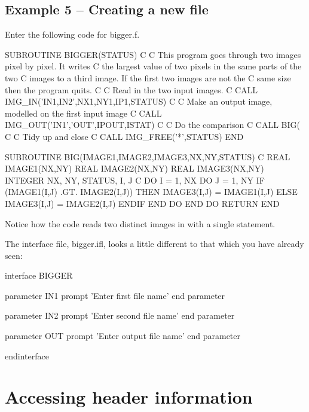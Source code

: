 \documentclass[11pt,nolof]{starlink}
\begin{document}
\subsection{Example 5 -- Creating a new file}

Enter the following code for \textsf{bigger.f}.

\begin{small}
\begin{terminalv}
      SUBROUTINE BIGGER(STATUS)
C
C This program goes through two images pixel by pixel. It writes
C the largest value of two pixels in the same parts of the two
C images to a third image. If the first two images are not the
C same size then the program quits.
C
C Read in the two input images.
C
      CALL IMG_IN('IN1,IN2',NX1,NY1,IP1,STATUS)
C
C Make an output image, modelled on the first input image
C
      CALL IMG_OUT('IN1','OUT',IPOUT,ISTAT)
C
C Do the comparison
C
      CALL BIG(%
C
C Tidy up and close
C
      CALL IMG_FREE('*',STATUS)
      END

      SUBROUTINE BIG(IMAGE1,IMAGE2,IMAGE3,NX,NY,STATUS)
C
      REAL IMAGE1(NX,NY)
      REAL IMAGE2(NX,NY)
      REAL IMAGE3(NX,NY)
      INTEGER NX, NY, STATUS, I, J
C
      DO I = 1, NX
        DO J = 1, NY
          IF (IMAGE1(I,J) .GT. IMAGE2(I,J)) THEN
            IMAGE3(I,J) = IMAGE1(I,J)
          ELSE
            IMAGE3(I,J) = IMAGE2(I,J)
          ENDIF
        END DO
      END DO
      RETURN
      END
\end{terminalv}
\end{small}

Notice how the code reads two distinct images in with a single statement.

The interface file, \textsf{bigger.ifl}, looks a little different to that
which you have already seen:

\begin{small}
\begin{terminalv}
interface BIGGER

  parameter IN1
    prompt 'Enter first file name'
  end parameter

  parameter IN2
    prompt 'Enter second file name'
  end parameter

  parameter OUT
    prompt 'Enter output file name'
  end parameter

endinterface
\end{terminalv}
\end{small}

\section{Accessing header information}
\end{document}
